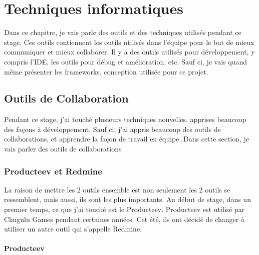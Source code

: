 \chapter{Techniques informatiques} %
\label{cha:techniques_informatiques}

Dans ce chapitre, je vais parle des outils et des techniques utilisés pendant ce stage. Ces outils contiennent les outils utilisés dans l'équipe pour le but de mieux communiquer et mieux collaborer. Il y a des outils utilisés pour développement, y compris l'IDE, les outils pour débug et amélioration, etc. Sauf ci, je vais quand même présenter les frameworks, conception utilisée pour ce projet.


\section{Outils de Collaboration} %
\label{sec:outils_de_collaboration}


Pendant ce stage, j'ai touché plusieurs techniques nouvelles, apprises beaucoup des façons à développement. Sauf ci, j'ai appris beaucoup des outils de collaborations, et apprendre la façon de travail en équipe. Dans cette section, je vais parler des outils de collaborations


\subsection{Producteev et Redmine} %
\label{ssub:producteev_et_redmine}

La raison de mettre les 2 outils ensemble est non seulement les 2 outils se ressemblent, mais aussi, ils sont les plus importants. Au début de stage, dans un premier temps, ce que j'ai touché est le Producteev. Producteev est utilisé par Chugulu Games pendant certaines années. Cet été, ils ont décidé de changer à utiliser un autre outil qui s'appelle Redmine. 

\subsubsection{Producteev} %
\label{ssub:producteev}


